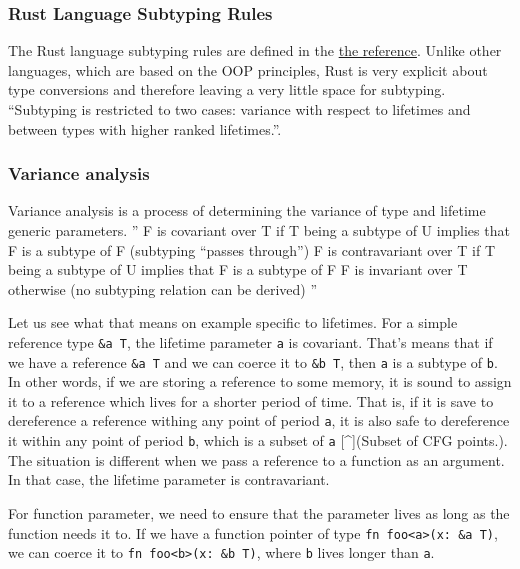 \hypertarget{rust-language-subtyping-rules}{%
\subsubsection{Rust Language Subtyping
Rules}\label{rust-language-subtyping-rules}}

The Rust language subtyping rules are defined in the
\href{https://doc.rust-lang.org/reference/subtyping.html}{the
reference}. Unlike other languages, which are based on the OOP
principles, Rust is very explicit about type conversions and therefore
leaving a very little space for subtyping. ``Subtyping is restricted to
two cases: variance with respect to lifetimes and between types with
higher ranked lifetimes.''.

\hypertarget{variance-analysis}{%
\subsubsection{Variance analysis}\label{variance-analysis}}

Variance analysis is a process of determining the variance of type and
lifetime generic parameters. '' F is covariant over T if T being a
subtype of U implies that F is a subtype of F (subtyping ``passes
through'') F is contravariant over T if T being a subtype of U implies
that F is a subtype of F F is invariant over T otherwise (no subtyping
relation can be derived) ''

Let us see what that means on example specific to lifetimes. For a
simple reference type \texttt{\&\textquotesingle{}a\ T}, the lifetime
parameter \texttt{\textquotesingle{}a} is covariant. That's means that
if we have a reference \texttt{\&\textquotesingle{}a\ T} and we can
coerce it to \texttt{\&\textquotesingle{}b\ T}, then
\texttt{\textquotesingle{}a} is a subtype of
\texttt{\textquotesingle{}b}. In other words, if we are storing a
reference to some memory, it is sound to assign it to a reference which
lives for a shorter period of time. That is, if it is save to
dereference a reference withing any point of period
\texttt{\textquotesingle{}a}, it is also safe to dereference it within
any point of period \texttt{\textquotesingle{}b}, which is a subset of
\texttt{\textquotesingle{}a} {[}\^{}{]}(Subset of CFG points.). The
situation is different when we pass a reference to a function as an
argument. In that case, the lifetime parameter is contravariant.

For function parameter, we need to ensure that the parameter lives as
long as the function needs it to. If we have a function pointer of type
\texttt{fn\ foo\textless{}\textquotesingle{}a\textgreater{}(x:\ \&\textquotesingle{}a\ T)},
we can coerce it to
\texttt{fn\ foo\textless{}\textquotesingle{}b\textgreater{}(x:\ \&\textquotesingle{}b\ T)},
where \texttt{\textquotesingle{}b} lives longer than
\texttt{\textquotesingle{}a}.

